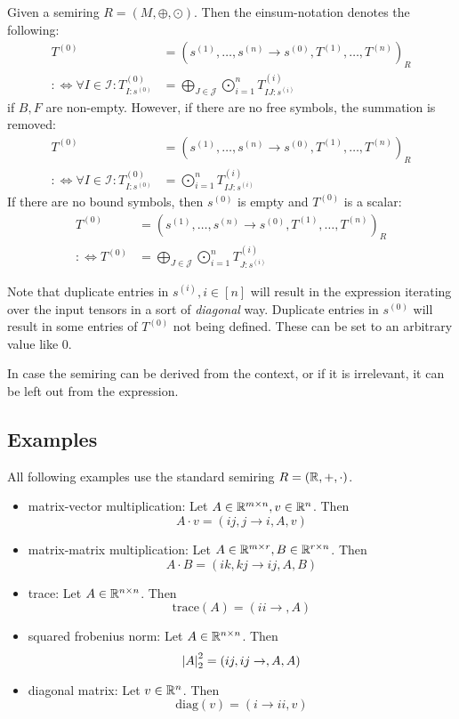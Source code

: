 \begin{definition}
    Given a semiring $R = (M, \oplus, \odot)$. Then the einsum-notation denotes the following:
    \begin{align*}
        T^{(0)}                                               & = (s^{(1)},\dots,s^{(n)} \rightarrow s^{(0)}, T^{(1)},\dots,T^{(n)})_R                  \\
        :\iff \forall I \in \mathcal{I}: T^{(0)}_{I: s^{(0)}} & = \bigoplus\limits_{J \in \mathcal{J}} \bigodot\limits_{i = 1}^{n} T^{(i)}_{IJ:s^{(i)}}
    \end{align*}
    if $B,F$ are non-empty. However, if there are no free symbols, the summation is removed:
    \begin{align*}
        T^{(0)}                                               & = (s^{(1)},\dots,s^{(n)} \rightarrow s^{(0)}, T^{(1)},\dots,T^{(n)})_R \\
        :\iff \forall I \in \mathcal{I}: T^{(0)}_{I: s^{(0)}} & = \bigodot\limits_{i = 1}^{n} T^{(i)}_{IJ:s^{(i)}}
    \end{align*}
    If there are no bound symbols, then $s^{(0)}$ is empty and $T^{(0)}$ is a scalar:
    \begin{align*}
        T^{(0)}       & = (s^{(1)},\dots,s^{(n)} \rightarrow s^{(0)}, T^{(1)},\dots,T^{(n)})_R                 \\
        :\iff T^{(0)} & = \bigoplus\limits_{J \in \mathcal{J}} \bigodot\limits_{i = 1}^{n} T^{(i)}_{J:s^{(i)}}
    \end{align*}

    Note that duplicate entries in $s^{(i)}, i \in [n]$ will result in the expression iterating over the input tensors in a sort of \textit{diagonal} way.
    Duplicate entries in $s^{(0)}$ will result in some entries of $T^{(0)}$ not being defined. These can be set to an arbitrary value like 0.

    In case the semiring can be derived from the context, or if it is irrelevant, it can be left out from the expression.
\end{definition}

\subsection{Examples}
All following examples use the standard semiring $R = (\mathbb{R}, +, \cdot)$.
\begin{itemize}
    \item matrix-vector multiplication: Let $A \in \mathbb{R}^{m \times n}, v \in \mathbb{R}^{n}$. Then
          $$A \cdot v = (ij, j \rightarrow i, A, v)$$
    \item matrix-matrix multiplication: Let $A \in \mathbb{R}^{m \times r}, B \in \mathbb{R}^{r \times n}$. Then
          $$A \cdot B = (ik, kj \rightarrow ij, A, B)$$
    \item trace: Let $A \in \mathbb{R}^{n \times n}$. Then
          $$\text{trace}(A) = (ii \rightarrow, A)$$
    \item squared frobenius norm: Let $A \in \mathbb{R}^{n \times n}$. Then
          $$\left| A \right|_2^2 = (ij, ij \rightarrow,A,A)$$
    \item diagonal matrix: Let $v \in \mathbb{R}^{n}$. Then
          $$\text{diag}(v) = (i \rightarrow ii, v)$$
\end{itemize}


